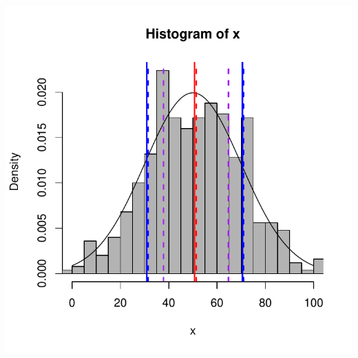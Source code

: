 \documentclass{beamer}\usepackage[]{graphicx}\usepackage[]{color}
\newenvironment{knitrout}{}{} %
\renewenvironment{knitrout}{\setlength{\topsep}{0mm}}{}
\begin{document}
\begin{frame}[fragile]
\begin{columns}[c]
\centering
\begin{knitrout}
\color{fgcolor}
\includegraphics[width=1.1\linewidth]{figure/unnamed-chunk-11-1} 

\end{knitrout}

\end{columns}

\end{frame} 
\end{document}
